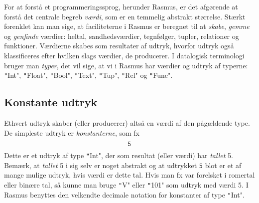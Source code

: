\documentclass{article}
\begin{document}
For at forst\aa{} et 
programmeringssprog, herunder {\sc Rasmus}, er det 
afg\o{}rende at forst\aa{}
det centrale begreb {\em v\ae{}rdi}, som er en temmelig abstrakt
st\o{}rrelse. St\ae{}rkt forenklet kan man sige, at faciliteterne i
{\sc Rasmus} er beregnet til at {\em skabe}, {\em gemme\/}
og {\em genfinde\/} v\ae{}rdier: heltal, sandhedsv\ae{}rdier,
tegnf\o{}lger, tupler, relationer og funktioner.
V\ae{}rdierne skabes som resultater af udtryk, hvorfor udtryk ogs\aa{}
klassificeres efter hvilken slags v\ae{}rdier, de producerer.
I datalogisk terminologi bruger man {\em typer}, det vil sige,
at vi i {\sc Rasmus} har v\ae{}rdier og udtryk af typerne:
\texttt"Int", \texttt"Float", \texttt"Bool", \texttt"Text", \texttt"Tup", \texttt"Rel" og \texttt"Func".

\subsection{Konstante udtryk}
Ethvert udtryk skaber (eller producerer) alts\aa{} en v\ae{}rdi af den
p\aa{}g\ae{}ldende type. De simpleste udtryk er {\em konstanterne},
som fx
$$\mbox{\tt 5}$$
Dette er et udtryk af type \texttt"Int", der som resultat (eller v\ae{}rdi)
har {\em tallet\/} 5. Bem\ae{}rk, at {\em tallet\/} 5 i sig selv er noget
abstrakt og at udtrykket {\tt 5} blot er et af mange mulige udtryk, hvis
v\ae{}rdi er dette tal. Hvis man fx var forelsket i romertal eller
bin\ae{}re tal, s\aa{} kunne man bruge \texttt"V" eller \texttt"101" som
udtryk med v\ae{}rdi 5. I {\sc Rasmus} benyttes den velkendte decimale
notation for konstanter af type \texttt"Int".
\end{document}
